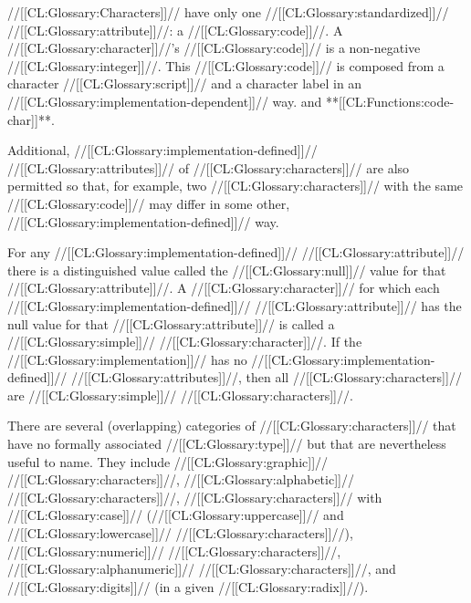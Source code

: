 //[[CL:Glossary:Characters]]// have only one //[[CL:Glossary:standardized]]// //[[CL:Glossary:attribute]]//:
a //[[CL:Glossary:code]]//.  A //[[CL:Glossary:character]]//'s //[[CL:Glossary:code]]// is a non-negative //[[CL:Glossary:integer]]//.
This //[[CL:Glossary:code]]// is composed from a character //[[CL:Glossary:script]]// and a character label
in an //[[CL:Glossary:implementation-dependent]]// way.   and **[[CL:Functions:code-char]]**.






Additional, //[[CL:Glossary:implementation-defined]]// //[[CL:Glossary:attributes]]// of //[[CL:Glossary:characters]]//
are also permitted
so that, for example, 
two //[[CL:Glossary:characters]]// with the same //[[CL:Glossary:code]]// may differ 
in some other, //[[CL:Glossary:implementation-defined]]// way.

For any //[[CL:Glossary:implementation-defined]]// //[[CL:Glossary:attribute]]//
there is a distinguished value
called the //[[CL:Glossary:null]]// value for that //[[CL:Glossary:attribute]]//. 
A //[[CL:Glossary:character]]// for which each //[[CL:Glossary:implementation-defined]]// //[[CL:Glossary:attribute]]//
has the null value for that //[[CL:Glossary:attribute]]// is called a //[[CL:Glossary:simple]]// //[[CL:Glossary:character]]//.
If the //[[CL:Glossary:implementation]]// has no //[[CL:Glossary:implementation-defined]]// //[[CL:Glossary:attributes]]//,
then all //[[CL:Glossary:characters]]// are //[[CL:Glossary:simple]]// //[[CL:Glossary:characters]]//.

\endSubsection%


There are several (overlapping) categories of //[[CL:Glossary:characters]]// that have no formally
associated //[[CL:Glossary:type]]// but that are nevertheless useful to name. 
They include
     //[[CL:Glossary:graphic]]// //[[CL:Glossary:characters]]//, 
     //[[CL:Glossary:alphabetic]]// //[[CL:Glossary:characters]]//,
     //[[CL:Glossary:characters]]// with //[[CL:Glossary:case]]// 
       (//[[CL:Glossary:uppercase]]// and //[[CL:Glossary:lowercase]]// //[[CL:Glossary:characters]]//),
     //[[CL:Glossary:numeric]]// //[[CL:Glossary:characters]]//,
     //[[CL:Glossary:alphanumeric]]// //[[CL:Glossary:characters]]//,
 and //[[CL:Glossary:digits]]// (in a given //[[CL:Glossary:radix]]//).

